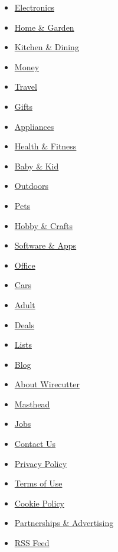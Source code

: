 \begin{itemize}
\tightlist
\item
  \href{/wirecutter/electronics/}{Electronics}
\item
  \href{/wirecutter/home-garden/}{Home \& Garden}
\item
  \href{/wirecutter/kitchen-dining/}{Kitchen \& Dining}
\item
  \href{/wirecutter/money/}{Money}
\item
  \href{/wirecutter/travel/}{Travel}
\item
  \href{/wirecutter/gifts/}{Gifts}
\item
  \href{/wirecutter/appliances/}{Appliances}
\item
  \href{/wirecutter/health-fitness/}{Health \& Fitness}
\item
  \href{/wirecutter/baby-kid/}{Baby \& Kid}
\item
  \href{/wirecutter/outdoors/}{Outdoors}
\item
  \href{/wirecutter/pets/}{Pets}
\item
  \href{/wirecutter/hobby-crafts/}{Hobby \& Crafts}
\item
  \href{/wirecutter/software/}{Software \& Apps}
\item
  \href{/wirecutter/office/}{Office}
\item
  \href{/wirecutter/cars/}{Cars}
\item
  \href{/wirecutter/adult/}{Adult}
\item
  \href{/wirecutter/deals/}{Deals}
\item
  \href{/wirecutter/lists/}{Lists}
\item
  \href{/wirecutter/blog/}{Blog}
\end{itemize}

\begin{itemize}
\tightlist
\item
  \href{/wirecutter/about/}{About Wirecutter}
\item
  \href{/wirecutter/masthead/}{Masthead}
\item
  \href{/wirecutter/jobs/}{Jobs}
\item
  \href{/wirecutter/contact-us/}{Contact Us}
\end{itemize}

\begin{itemize}
\tightlist
\item
  \href{https://www.nytimes3xbfgragh.onion/subscription/privacy-policy\#/privacy}{Privacy
  Policy}
\item
  \href{https://help.nytimes3xbfgragh.onion/hc/en-us/articles/115014893428-Terms-of-service}{Terms
  of Use}
\item
  \href{https://www.nytimes3xbfgragh.onion/subscription/privacy-policy\#/cookie}{Cookie
  Policy}
\item
  \href{/wirecutter/partners/}{Partnerships \& Advertising}
\item
  \href{/wirecutter/feed/}{RSS Feed}
\end{itemize}

